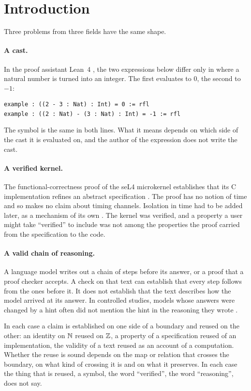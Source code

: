 \section{Introduction}
\label{sec:intro}

Three problems from three fields have the same shape.

\paragraph{A cast.} In the proof assistant Lean~4 \citep{demoura2021}, the two expressions
below differ only in where a natural number is turned into an integer. The first evaluates
to $0$, the second to $-1$:
\begin{lstlisting}
example : ((2 - 3 : Nat) : Int) = 0 := rfl
example : ((2 : Nat) - (3 : Nat) : Int) = -1 := rfl
\end{lstlisting}
The symbol \code{-} is the same in both lines. What it means depends on which side of the
cast it is evaluated on, and the author of the expression does not write the cast.

\paragraph{A verified kernel.} The functional-correctness proof of the seL4 microkernel
establishes that its C implementation refines an abstract specification
\citep{klein2009}. The proof has no notion of time and so makes no claim about timing
channels. Isolation in time had to be added later, as a mechanism of its own
\citep{ge2019}. The kernel was verified, and a property a user might take ``verified'' to
include was not among the properties the proof carried from the specification to the
code.

\paragraph{A valid chain of reasoning.} A language model writes out a chain of steps
before its answer, or a proof that a proof checker accepts. A check on that text can
establish that every step follows from the ones before it. It does not establish that the
text describes how the model arrived at its answer. In controlled studies, models whose
answers were changed by a hint often did not mention the hint in the reasoning they wrote
\citep{turpin2023,chen2025}.

\medskip
In each case a claim is established on one side of a boundary and reused on the other: an
identity on $\mathbb{N}$ reused on $\mathbb{Z}$, a property of a specification reused of an
implementation, the validity of a text reused as an account of a computation. Whether the
reuse is sound depends on the map or relation that crosses the boundary, on what kind of
crossing it is and on what it preserves. In each case the thing that is reused, a symbol,
the word ``verified'', the word ``reasoning'', does not say.

